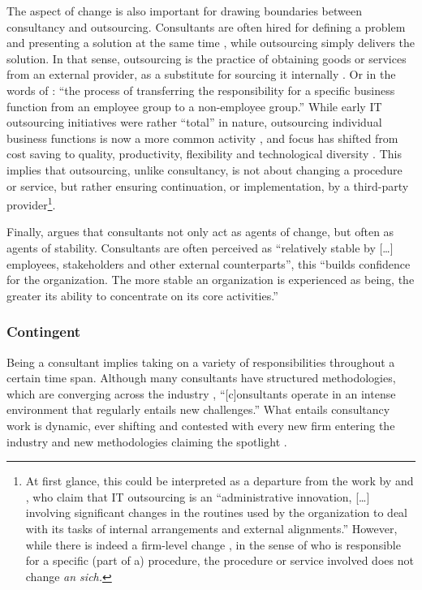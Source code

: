 \documentclass[12pt]{article}
\begin{document}
The aspect of change is also important for drawing boundaries between
consultancy and outsourcing. Consultants are often hired for defining a
problem and presenting a solution at the same time \citep[
272]{furusten2009}, while outsourcing simply delivers the solution. In
that sense, outsourcing is the practice of obtaining goods or services
from an external provider, as a substitute for sourcing it internally
\citep[ 2]{lacity2012}. Or in the words of \citet[374]{zhu2001}: ``the
process of transferring the responsibility for a specific business
function from an employee group to a non-employee group.'' While early
IT outsourcing initiatives were rather ``total'' \citet{willcocks1995}
in nature, outsourcing individual business functions is now a more
common activity \citep[ 377]{zhu2001}, and focus has shifted from cost
saving to quality, productivity, flexibility and technological diversity
\citep[ 185]{kirilov2012}. This implies that outsourcing, unlike
consultancy, is not about changing a procedure or service, but rather
ensuring continuation, or implementation, by a third-party
provider\footnote{At first glance, this could be interpreted as a
  departure from the work by \citet{loh1992} and
  \citet{venkatraman1994}, who claim that IT outsourcing is an
  ``administrative innovation, {[}\ldots{]} involving significant
  changes in the routines used by the organization to deal with its
  tasks of internal arrangements and external alignments.'' However,
  while there is indeed a firm-level change \citep[ 14]{nelson1985}, in
  the sense of who is responsible for a specific (part of a) procedure,
  the procedure or service involved does not change \emph{an sich.}}.

Finally, \citet[272-273]{furusten2009} argues that consultants not only
act as agents of change, but often as agents of stability. Consultants
are often perceived as ``relatively stable by {[}\ldots{]} employees,
stakeholders and other external counterparts'', this ``builds confidence
for the organization. The more stable an organization is experienced as
being, the greater its ability to concentrate on its core activities.''

\hypertarget{contingent}{%
\subsubsection{Contingent}\label{contingent}}

Being a consultant implies taking on a variety of responsibilities
throughout a certain time span. Although many consultants have
structured methodologies, which are converging across the industry
\citep[ 17]{werr1986}, ``{[}c{]}onsultants operate in an intense
environment that regularly entails new challenges.'' \citep[
138]{chowdhury2021} What entails consultancy work is dynamic, ever
shifting and contested with every new firm entering the industry and new
methodologies claiming the spotlight \citep[ 24]{kipping2012}.
\end{document}

